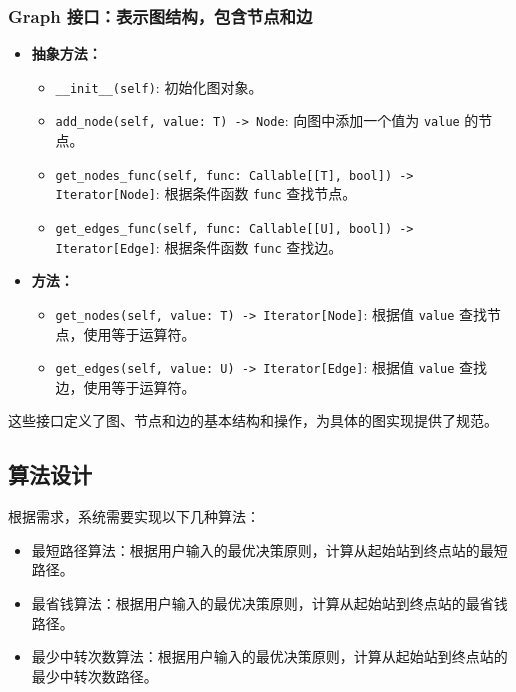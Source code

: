 \documentclass[10pt]{article}
\begin{document}
    \subsubsection{Graph 接口：表示图结构，包含节点和边}
    \begin{itemize}[label=\textbullet]
        \item \textbf{抽象方法：}
        \begin{itemize}[label=\textbullet]
            \item \texttt{\_\_init\_\_(self)}: 初始化图对象。
            \item \texttt{add\_node(self, value: T) -> Node}: 向图中添加一个值为 \texttt{value} 的节点。
            \item \texttt{get\_nodes\_func(self, func: Callable[[T], bool]) -> Iterator[Node]}: 根据条件函数 \texttt{func} 查找节点。
            \item \texttt{get\_edges\_func(self, func: Callable[[U], bool]) -> Iterator[Edge]}: 根据条件函数 \texttt{func} 查找边。
        \end{itemize}
        \item \textbf{方法：}
        \begin{itemize}[label=\textbullet]
            \item \texttt{get\_nodes(self, value: T) -> Iterator[Node]}: 根据值 \texttt{value} 查找节点，使用等于运算符。
            \item \texttt{get\_edges(self, value: U) -> Iterator[Edge]}: 根据值 \texttt{value} 查找边，使用等于运算符。
        \end{itemize}
    \end{itemize}

    这些接口定义了图、节点和边的基本结构和操作，为具体的图实现提供了规范。

    \subsection{算法设计}
    根据需求，系统需要实现以下几种算法：
    \begin{itemize}
        \item 最短路径算法：根据用户输入的最优决策原则，计算从起始站到终点站的最短路径。
        \item 最省钱算法：根据用户输入的最优决策原则，计算从起始站到终点站的最省钱路径。
        \item 最少中转次数算法：根据用户输入的最优决策原则，计算从起始站到终点站的最少中转次数路径。
    \end{itemize}
\end{document}
